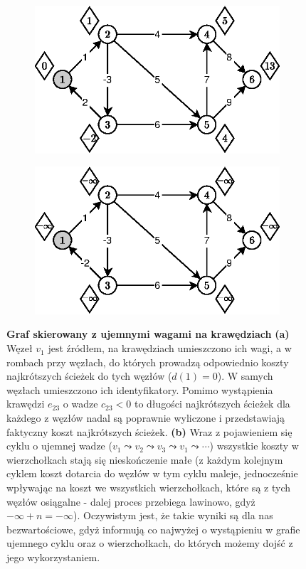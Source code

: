 \begin{figure}[!htbp]
	\centering
	\begin{subfigure}[b]{0.45\textwidth}
		\includegraphics[width=\textwidth]{Chapter_I/8/1_8a.eps}
		\caption{}
	\end{subfigure}%
	\qquad
	\begin{subfigure}[b]{0.45\textwidth}
		\includegraphics[width=\textwidth]{Chapter_I/8/1_8b.eps}
		\caption{}
	\end{subfigure}
	\caption{\textbf{Graf skierowany z ujemnymi wagami na krawędziach} \textbf{(a)} Węzeł $v_{1}$ jest źródłem, na krawędziach umieszczono ich wagi, a w rombach przy węzłach, do których prowadzą odpowiednio koszty najkrótszych ścieżek do tych węzłów ($d \left( 1 \right) = 0$). W samych węzłach umieszczono ich identyfikatory. Pomimo wystąpienia krawędzi $e_{23}$ o wadze $c_{23} < 0$ to długości najkrótszych ścieżek dla każdego z węzłów nadal są poprawnie wyliczone i przedstawiają faktyczny koszt najkrótszych ścieżek. \textbf{(b)} Wraz z pojawieniem się cyklu o ujemnej wadze ($v_{1} \leadsto v_{2} \leadsto v_{3} \leadsto v_{1} \leadsto \cdots$) wszystkie koszty w wierzchołkach stają się nieskończenie małe (z każdym kolejnym cyklem koszt dotarcia do węzłów w tym cyklu maleje, jednocześnie wpływając na koszt we wszystkich wierzchołkach, które są z tych węzłów osiągalne - dalej proces przebiega lawinowo, gdyż $- \infty + n = - \infty$). Oczywistym jest, że takie wyniki są dla nas bezwartościowe, gdyż informują co najwyżej o wystąpieniu w grafie ujemnego cyklu oraz o wierzchołkach, do których możemy dojść z jego wykorzystaniem.}\label{fig:negativeCycle}
\end{figure}

